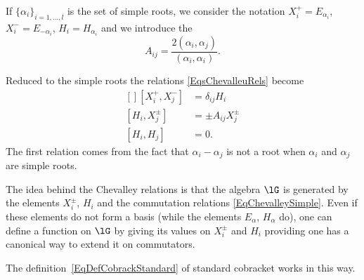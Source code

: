 \begin{definition}  \label{DefORftFjP}
    If \( \{ \alpha_i \}_{i=1,\ldots,l}\) is the set of simple roots, we consider the notation \( X_i^+=E_{\alpha_i}\), \( X^-_i=E_{-\alpha_i}\), \( H_i=H_{\alpha_i}\) and we introduce the 
    \begin{equation}
        A_{ij}=\frac{ 2(\alpha_i,\alpha_j) }{ (\alpha_i,\alpha_i) }.
    \end{equation}
\end{definition}
Reduced to the simple roots the relations \eqref{EqsChevalleuRels} become
\begin{equation}        \label{EqChevalleySimple}
    \begin{aligned}[]
        [X^+_i,X^-_j]&=\delta_{ij}H_i\\
        [H_i,X^{\pm}_j]&=\pm A_{ij}X^{\pm}_j\\
        [H_i,H_j]&=0.
    \end{aligned}
\end{equation}
The first relation comes from the fact that \( \alpha_i-\alpha_j\) is not a root when \( \alpha_i\) and \( \alpha_j\) are simple roots.

\begin{remark}
    The idea behind the Chevalley relations  is that the algebra \( \lG\) is generated by the elements \( X^{\pm}_i\), \( H_i\) and the commutation relations \eqref{EqChevalleySimple}. Even if these elements do not form a basis (while the elements \( E_{\alpha}\), \( H_{\alpha}\) do), one can define a function on \( \lG\) by giving its values on \( X^{\pm}_i\) and \( H_i\) providing one has a canonical way to extend it on commutators.

    The definition~\ref{EqDefCobrackStandard} of standard cobracket works in this way.
\end{remark}

